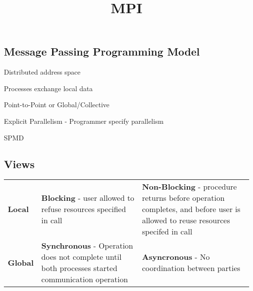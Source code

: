 \documentclass[12pt]{article}
\title{\textbf{MPI}}
\date{}
\begin{document}
\maketitle

\begin{spacing}{1.5}

\section{Message Passing Programming Model}

\begin{itemize*}
	\item Distributed address space
	\item Processes exchange local data
	\item Point-to-Point or Global/Collective
	\item Explicit Parallelism - Programmer specify parallelism
	\item SPMD
\end{itemize*}

\subsection{Views}

\begin{tabular}{p{2cm} | p{5.5cm} p{5.5cm}}
\textbf{Local} & \textbf{Blocking} - user allowed to refuse resources specified in call & \textbf{Non-Blocking} - procedure returns before operation completes, and before user is allowed to reuse resources specifed in call \\
\textbf{Global} & \textbf{Synchronous} - Operation does not complete until both processes started communication operation & \textbf{Asyncronous} - No coordination between parties \\
\end{tabular}


\end{spacing}
\end{document}
